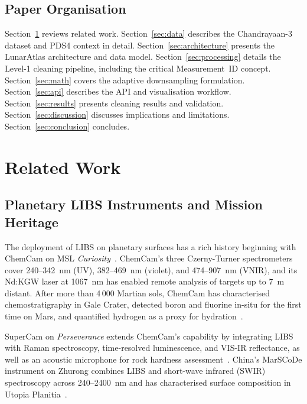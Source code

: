 \documentclass[a4paper,twocolumn,10pt]{article}
\begin{document}
\subsection{Paper Organisation}

Section~\ref{sec:related} reviews related work.
Section~\ref{sec:data} describes the Chandrayaan-3 dataset and PDS4
context in detail.  Section~\ref{sec:architecture} presents the
LunarAtlas architecture and data model.
Section~\ref{sec:processing} details the Level-1 cleaning pipeline,
including the critical Measurement~ID concept.
Section~\ref{sec:math} covers the adaptive downsampling formulation.
Section~\ref{sec:api} describes the API and visualisation workflow.
Section~\ref{sec:results} presents cleaning results and validation.
Section~\ref{sec:discussion} discusses implications and limitations.
Section~\ref{sec:conclusion} concludes.


\section{Related Work}
\label{sec:related}

\subsection{Planetary LIBS Instruments and Mission Heritage}

The deployment of LIBS on planetary surfaces has a rich history
beginning with ChemCam on MSL \emph{Curiosity}~\cite{Wiens2012,
Maurice2012}.  ChemCam's three Czerny-Turner spectrometers cover
240--342~nm (UV), 382--469~nm (violet), and 474--907~nm (VNIR), and
its Nd:KGW laser at 1067~nm has enabled remote analysis of targets up
to 7~m distant.  After more than 4\,000 Martian sols, ChemCam has
characterised chemostratigraphy in Gale Crater, detected boron and
fluorine in-situ for the first time on Mars, and quantified hydrogen as
a proxy for hydration~\cite{Gasda2017,Schroder2015}.

SuperCam on \emph{Perseverance} extends ChemCam's capability by
integrating LIBS with Raman spectroscopy, time-resolved luminescence,
and VIS-IR reflectance, as well as an acoustic microphone for rock
hardness assessment~\cite{Wiens2020,Maurice2022}.  China's MarSCoDe
instrument on Zhurong combines LIBS and short-wave infrared (SWIR)
spectroscopy across 240--2400~nm and has characterised surface
composition in Utopia Planitia~\cite{Xu2021,Zhao2023}.
\end{document}
